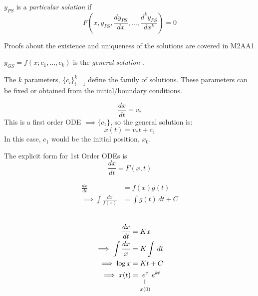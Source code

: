 \documentclass[twoside]{scrartcl}
\begin{document}



\begin{definition}
$y_{PS}$ is a \emph{particular solution} if 
\[F\left(x,y_{PS},\frac{dy_{PS}}{dx},\dots,\frac{d^ky_{PS}}{dx^k}\right)= 0\]
\end{definition}

Proofs about the existence and uniqueness of the solutions are covered in M2AA1\\

\begin{definition}
$y_{GS} = f(x; c_1,\dots,c_k)$ is the \emph{general solution	}.

 The $k$ parameters, $\{c_i\}_{i=1}^k$ define the family of solutions. These parameters can be fixed or obtained from the initial/boundary conditions.
\end{definition}\vspace*{5pt}

\begin{example}[Velocity]
\[\frac{dx}{dt} = v_*\]
This is a first order ODE $\implies \{c_1\}$, so the general solution is:
\[x(t) = v_*t + c_1\]
In this case, $c_1$ would be the initial position, $x_0$. 
\end{example}
\pagebreak 




The explicit form for 1st Order ODEs is
\[\frac{dx}{dt} = F(x,t)\]

\[
\begin{aligned}
  \frac{dx}{dt} &= f(x)g(t)\\
  \implies \int \frac{dx}{f(x)} &= \int g(t)\,dt + C
\end{aligned}
\]~

\begin{example}
\[
\begin{aligned}
  \frac{dx}{dt} &= Kx\\
  \implies \int \frac{dx}{x} &= K\int\, dt\\
  \implies \log x &= Kt + C\\
  \implies x(t) &= \equalto{e^c}{x(0)}\,e^{kt}
\end{aligned}
\]
\end{example}
\end{document}

